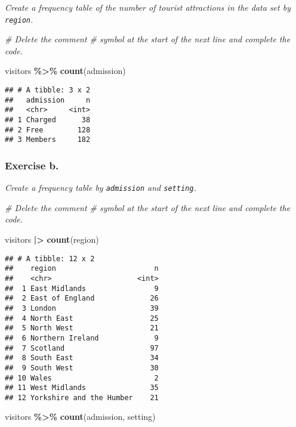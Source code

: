 \documentclass[
]{article}
\newenvironment{Shaded}{\begin{snugshade}}{\end{snugshade}}
\newcommand{\CommentTok}[1]{\textcolor[rgb]{0.56,0.35,0.01}{\textit{#1}}}
\newcommand{\FunctionTok}[1]{\textcolor[rgb]{0.13,0.29,0.53}{\textbf{#1}}}
\newcommand{\NormalTok}[1]{#1}
\newcommand{\SpecialCharTok}[1]{\textcolor[rgb]{0.81,0.36,0.00}{\textbf{#1}}}
\begin{document}
\emph{Create a frequency table of the number of tourist attractions in
the data set by \texttt{region}.}

\begin{Shaded}
\begin{Highlighting}[]
\CommentTok{\# Delete the comment \textquotesingle{}\#\textquotesingle{} symbol at the start of the next line and complete the code. }

\NormalTok{visitors }\SpecialCharTok{\%\textgreater{}\%} \FunctionTok{count}\NormalTok{(admission)}
\end{Highlighting}
\end{Shaded}

\begin{verbatim}
## # A tibble: 3 x 2
##   admission     n
##   <chr>     <int>
## 1 Charged      38
## 2 Free        128
## 3 Members     182
\end{verbatim}

\subsubsection{Exercise b.}\label{exercise-b.}

\emph{Create a frequency table by \texttt{admission} and
\texttt{setting}.}

\begin{Shaded}
\begin{Highlighting}[]
\CommentTok{\# Delete the comment \textquotesingle{}\#\textquotesingle{} symbol at the start of the next line and complete the code.}

\NormalTok{visitors }\SpecialCharTok{|\textgreater{}} \FunctionTok{count}\NormalTok{(region)}
\end{Highlighting}
\end{Shaded}

\begin{verbatim}
## # A tibble: 12 x 2
##    region                       n
##    <chr>                    <int>
##  1 East Midlands                9
##  2 East of England             26
##  3 London                      39
##  4 North East                  25
##  5 North West                  21
##  6 Northern Ireland             9
##  7 Scotland                    97
##  8 South East                  34
##  9 South West                  30
## 10 Wales                        2
## 11 West Midlands               35
## 12 Yorkshire and the Humber    21
\end{verbatim}

\begin{Shaded}
\begin{Highlighting}[]
\NormalTok{visitors }\SpecialCharTok{\%\textgreater{}\%} \FunctionTok{count}\NormalTok{(admission, setting)}
\end{Highlighting}
\end{Shaded}
\end{document}
